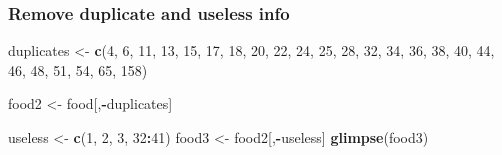 \documentclass[]{article}
\newenvironment{Shaded}{\begin{snugshade}}{\end{snugshade}}
\newcommand{\DecValTok}[1]{\textcolor[rgb]{0.00,0.00,0.81}{#1}}
\newcommand{\KeywordTok}[1]{\textcolor[rgb]{0.13,0.29,0.53}{\textbf{#1}}}
\newcommand{\NormalTok}[1]{#1}
\newcommand{\OperatorTok}[1]{\textcolor[rgb]{0.81,0.36,0.00}{\textbf{#1}}}
\newcommand{\StringTok}[1]{\textcolor[rgb]{0.31,0.60,0.02}{#1}}
\begin{document}
\hypertarget{remove-duplicate-and-useless-info}{%
\subsubsection{Remove duplicate and useless
info}\label{remove-duplicate-and-useless-info}}

\begin{Shaded}
\begin{Highlighting}[]
\NormalTok{duplicates <-}\StringTok{ }\KeywordTok{c}\NormalTok{(}\DecValTok{4}\NormalTok{, }\DecValTok{6}\NormalTok{, }\DecValTok{11}\NormalTok{, }\DecValTok{13}\NormalTok{, }\DecValTok{15}\NormalTok{, }\DecValTok{17}\NormalTok{, }\DecValTok{18}\NormalTok{, }\DecValTok{20}\NormalTok{, }\DecValTok{22}\NormalTok{, }
                \DecValTok{24}\NormalTok{, }\DecValTok{25}\NormalTok{, }\DecValTok{28}\NormalTok{, }\DecValTok{32}\NormalTok{, }\DecValTok{34}\NormalTok{, }\DecValTok{36}\NormalTok{, }\DecValTok{38}\NormalTok{, }\DecValTok{40}\NormalTok{, }
                \DecValTok{44}\NormalTok{, }\DecValTok{46}\NormalTok{, }\DecValTok{48}\NormalTok{, }\DecValTok{51}\NormalTok{, }\DecValTok{54}\NormalTok{, }\DecValTok{65}\NormalTok{, }\DecValTok{158}\NormalTok{)}

\NormalTok{food2 <-}\StringTok{ }\NormalTok{food[,}\OperatorTok{-}\NormalTok{duplicates]}

\NormalTok{useless <-}\StringTok{ }\KeywordTok{c}\NormalTok{(}\DecValTok{1}\NormalTok{, }\DecValTok{2}\NormalTok{, }\DecValTok{3}\NormalTok{, }\DecValTok{32}\OperatorTok{:}\DecValTok{41}\NormalTok{)}
\NormalTok{food3 <-}\StringTok{ }\NormalTok{food2[,}\OperatorTok{-}\NormalTok{useless]}
\KeywordTok{glimpse}\NormalTok{(food3)}
\end{Highlighting}
\end{Shaded}
\end{document}
